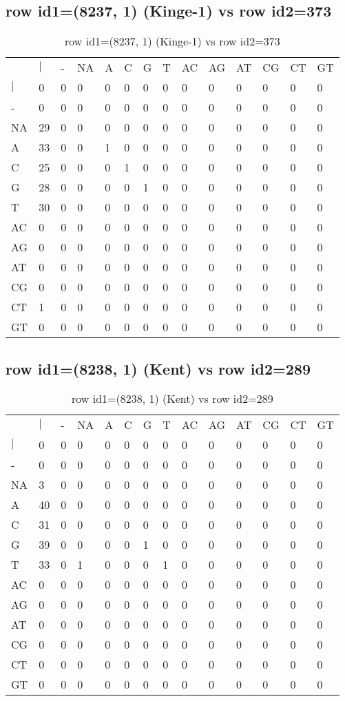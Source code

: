 \subsection{row id1=(8237, 1) (Kinge-1) vs row id2=373}
\begin{center}
\begin{longtable}{|l|l|l|l|l|l|l|l|l|l|l|l|l|l|}
\caption{row id1=(8237, 1) (Kinge-1) vs row id2=373} \label{table_dm364}\\
\hline
\\
\hline
&$|$&-&NA&A&C&G&T&AC&AG&AT&CG&CT&GT\\
$|$&0&0&0&0&0&0&0&0&0&0&0&0&0\\
-&0&0&0&0&0&0&0&0&0&0&0&0&0\\
NA&29&0&0&0&0&0&0&0&0&0&0&0&0\\
A&33&0&0&1&0&0&0&0&0&0&0&0&0\\
C&25&0&0&0&1&0&0&0&0&0&0&0&0\\
G&28&0&0&0&0&1&0&0&0&0&0&0&0\\
T&30&0&0&0&0&0&0&0&0&0&0&0&0\\
AC&0&0&0&0&0&0&0&0&0&0&0&0&0\\
AG&0&0&0&0&0&0&0&0&0&0&0&0&0\\
AT&0&0&0&0&0&0&0&0&0&0&0&0&0\\
CG&0&0&0&0&0&0&0&0&0&0&0&0&0\\
CT&1&0&0&0&0&0&0&0&0&0&0&0&0\\
GT&0&0&0&0&0&0&0&0&0&0&0&0&0\\
\hline
\end{longtable}
\end{center}

\subsection{row id1=(8238, 1) (Kent) vs row id2=289}
\begin{center}
\begin{longtable}{|l|l|l|l|l|l|l|l|l|l|l|l|l|l|}
\caption{row id1=(8238, 1) (Kent) vs row id2=289} \label{table_dm366}\\
\hline
\\
\hline
&$|$&-&NA&A&C&G&T&AC&AG&AT&CG&CT&GT\\
$|$&0&0&0&0&0&0&0&0&0&0&0&0&0\\
-&0&0&0&0&0&0&0&0&0&0&0&0&0\\
NA&3&0&0&0&0&0&0&0&0&0&0&0&0\\
A&40&0&0&0&0&0&0&0&0&0&0&0&0\\
C&31&0&0&0&0&0&0&0&0&0&0&0&0\\
G&39&0&0&0&0&1&0&0&0&0&0&0&0\\
T&33&0&1&0&0&0&1&0&0&0&0&0&0\\
AC&0&0&0&0&0&0&0&0&0&0&0&0&0\\
AG&0&0&0&0&0&0&0&0&0&0&0&0&0\\
AT&0&0&0&0&0&0&0&0&0&0&0&0&0\\
CG&0&0&0&0&0&0&0&0&0&0&0&0&0\\
CT&0&0&0&0&0&0&0&0&0&0&0&0&0\\
GT&0&0&0&0&0&0&0&0&0&0&0&0&0\\
\hline
\end{longtable}
\end{center}

